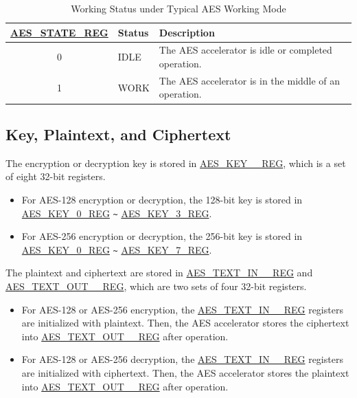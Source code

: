 \documentclass[main\_\_EN.tex]{subfiles}
\begin{document}
\begin{longtable}[c]{ | c | l | l| }
\caption{Working Status under Typical AES Working Mode}
\label{tab:aes-state-value-typical}
\\\hline
\rowcolor{lightgray}
\textbf{\hyperref[regdesc:AESSTATEREG]{AES\_STATE\_REG}} & \textbf{Status} &  \textbf{Description} \\ \hline

    0                   & IDLE      &   The AES accelerator is idle or completed operation.\\ \hline
    1                   & WORK      &   The AES accelerator is in the middle of an operation.     \\ \hline
\end{longtable}

\subsection{Key, Plaintext, and Ciphertext}

The encryption or decryption key is stored in \hyperref[regdesc:AESKEYnREG]{AES\_KEY\_\_REG}, which is a set of eight 32-bit registers.

\begin{itemize}
    \item For AES-128 encryption or decryption, the 128-bit key is stored in \hyperref[regdesc:AESKEYnREG]{AES\_KEY\_0\_REG} \verb+~+ \hyperref[regdesc:AESKEYnREG]{AES\_KEY\_3\_REG}.
    \item For AES-256 encryption or decryption, the 256-bit key is stored in \hyperref[regdesc:AESKEYnREG]{AES\_KEY\_0\_REG} \verb+~+ \hyperref[regdesc:AESKEYnREG]{AES\_KEY\_7\_REG}.
\end{itemize}

The plaintext and ciphertext are stored in \hyperref[regdesc:AESTEXTINnREG]{AES\_TEXT\_IN\_\_REG} and \hyperref[regdesc:AESTEXTOUTnREG]{AES\_TEXT\_OUT\_\_REG}, which are two sets of four 32-bit registers.

\begin{itemize}
    \item For AES-128 or AES-256 encryption, the \hyperref[regdesc:AESTEXTINnREG]{AES\_TEXT\_IN\_\_REG} registers are initialized with plaintext. Then, the AES accelerator stores the ciphertext into \hyperref[regdesc:AESTEXTOUTnREG]{AES\_TEXT\_OUT\_\_REG} after operation.
    \item For AES-128 or AES-256 decryption, the \hyperref[regdesc:AESTEXTINnREG]{AES\_TEXT\_IN\_\_REG} registers are initialized with ciphertext. Then, the AES accelerator stores the plaintext into \hyperref[regdesc:AESTEXTOUTnREG]{AES\_TEXT\_OUT\_\_REG} after operation.
\end{itemize}
\end{document}
